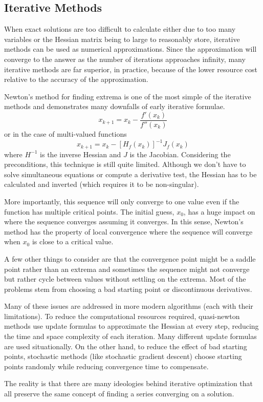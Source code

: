 \documentclass[10pt,a4paper]{report}
\begin{document}
			\subsection{Iterative Methods}
					When exact solutions are too difficult to calculate either due to too many variables or the Hessian matrix being to large
					to reasonably store, iterative methods can be used as numerical approximations. Since the approximation will converge to the
					answer as the number of iterations approaches infinity, many iterative methods are far superior, in practice, because of the lower
					resource cost relative to the accuracy of the approximation. \par
					Newton's method for finding extrema \autocite{fletcher2013practical} is one of the most simple of the iterative methods
					and demonstrates many downfalls of early iterative formulae.
					\begin{equation}
						x_{k+1} = x_k - \frac{f'(x_k)}{f''(x_k)}
						\label{eq:newtons-method-single}
					\end{equation}
					or in the case of multi-valued functions
					\begin{equation}
						x_{k+1} = x_k - [H_f(x_k)]^{-1} J_f(x_k)
						\label{eq:newtons-method-multi}
					\end{equation}
					where $H^{-1}$ is the inverse Hessian and $J$ is the Jacobian. Considering the preconditions, this technique is still quite limited.
					Although we don't have to solve simultaneous equations or compute a derivative test, the Hessian has to be calculated and inverted (which requires it to be non-singular). \par
					More importantly, this sequence will only converge to one value even if the function has multiple critical points. The initial guess, $x_0$,
					has a huge impact on where the sequence converges assuming it converges. In this sense, Newton's method has the
					property of local convergence where the sequence will converge when $x_0$ is close to a critical value. \par
					A few other things to consider are that the convergence point might be a saddle point rather than an extrema and sometimes the sequence might
					not converge but rather cycle between values without settling on the extrema. Most of the problems stem from choosing a bad starting point or
					discontinuous derivatives. \par
					Many of these issues are addressed in more modern algorithms (each with their limitations).
					To reduce the computational resources required, quasi-newton methods use update formulas to approximate the Hessian at every step, reducing the time and space complexity of each iteration.
					Many different update formulas are used situationally. On the other hand, to reduce the effect of bad starting points, stochastic methods (like stochastic gradient descent)
					choose starting points randomly while reducing convergence time to compensate. \par
					The reality is that there are many ideologies behind iterative optimization that
					all preserve the same concept of finding a series converging on a solution.
\end{document}
